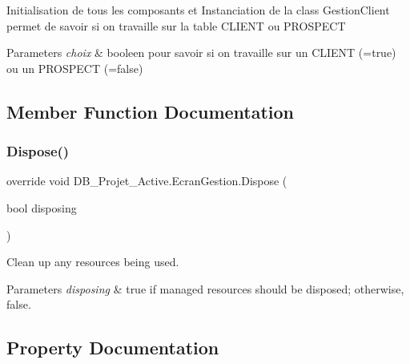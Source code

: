 Initialisation de tous les composants et Instanciation de la class Gestion\+Client permet de savoir si on travaille sur la table C\+L\+I\+E\+NT ou P\+R\+O\+S\+P\+E\+CT 


\begin{DoxyParams}{Parameters}
{\em choix} & booleen pour savoir si on travaille sur un C\+L\+I\+E\+NT (=true) ou un P\+R\+O\+S\+P\+E\+CT (=false)\\
\hline
\end{DoxyParams}


\subsection{Member Function Documentation}
\mbox{\label{class_d_b___projet___active_1_1_ecran_gestion_a6f1c94cfbefe9762eb36e15b30776869}} 
\subsubsection{\texorpdfstring{Dispose()}{Dispose()}}
{\footnotesize\ttfamily override void D\+B\+\_\+\+Projet\+\_\+\+Active.\+Ecran\+Gestion.\+Dispose (\begin{DoxyParamCaption}\item[{bool}]{disposing }\end{DoxyParamCaption})\hspace{0.3cm}{\ttfamily [protected]}}



Clean up any resources being used. 


\begin{DoxyParams}{Parameters}
{\em disposing} & true if managed resources should be disposed; otherwise, false.\\
\hline
\end{DoxyParams}


\subsection{Property Documentation}
\mbox{\label{class_d_b___projet___active_1_1_ecran_gestion_ab89bcfdd417751d779f79f1fcda817f6}} 
